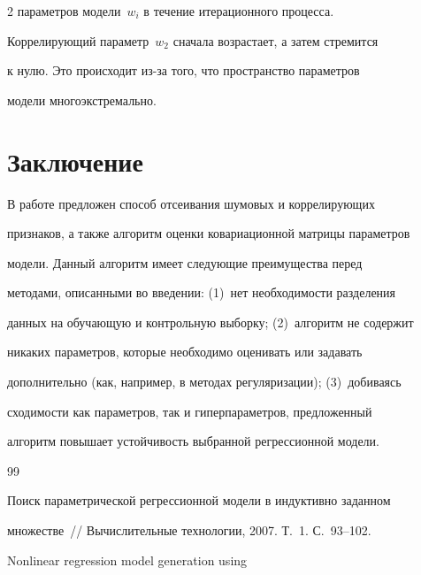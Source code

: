 \begin{multicols}{2}
параметров модели~$w_i$ в течение итерационного процесса.

Коррелирующий параметр~$w_2$ сначала возрастает, а затем стремится

к нулю. Это происходит из-за того, что пространство па\-ра\-мет\-ров

модели многоэкстремально.





\section{Заключение}



В работе предложен способ отсеивания шумовых и коррелирующих

признаков, а также алгоритм оценки ковариационной матрицы параметров

модели. Данный алгоритм имеет следующие преимущества  перед

методами, описанными во введении: (1)~нет необходимости разделения

данных на обуча\-ющую и контрольную выборку; (2)~алгоритм не содержит

никаких параметров, которые необходимо оценивать или задавать

дополнительно (как, например, в методах регуляризации); (3)~добиваясь

сходимости как параметров, так и ги\-пер\-па\-ра\-мет\-ров, предложенный

алгоритм повышает устойчивость выбранной регрессионной модели.



{\small\frenchspacing

{%


\begin{thebibliography}{99}






 Поиск параметрической регрессионной модели в индуктивно заданном

множестве~// Вычислительные технологии, 2007. Т.~1. С.~93--102.




 Nonlinear regression model generation using 


\end{thebibliography}}}
\end{multicols}

